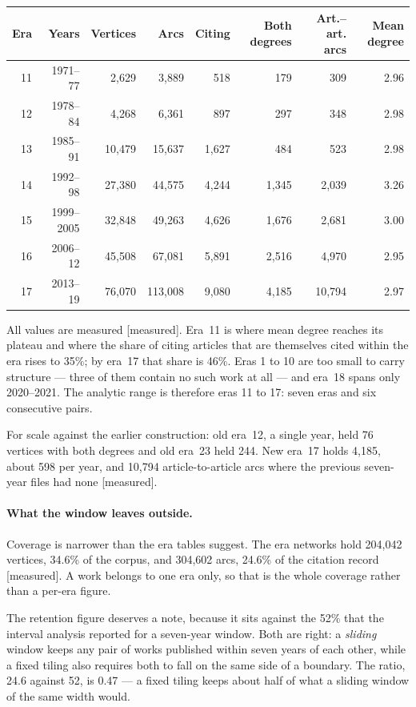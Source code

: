\documentclass[11pt]{article}
\newcommand{\meas}{{\footnotesize\textsf{[measured]}}}
\begin{document}
\begin{center}
\small
\begin{tabular}{rrrrrrrr}
\toprule
Era & Years & Vertices & Arcs & Citing & Both degrees & Art.--art. arcs & Mean degree \\
\midrule
11 & 1971--77 & 2{,}629 & 3{,}889 & 518 & 179 & 309 & 2.96 \\
12 & 1978--84 & 4{,}268 & 6{,}361 & 897 & 297 & 348 & 2.98 \\
13 & 1985--91 & 10{,}479 & 15{,}637 & 1{,}627 & 484 & 523 & 2.98 \\
14 & 1992--98 & 27{,}380 & 44{,}575 & 4{,}244 & 1{,}345 & 2{,}039 & 3.26 \\
15 & 1999--2005 & 32{,}848 & 49{,}263 & 4{,}626 & 1{,}676 & 2{,}681 & 3.00 \\
16 & 2006--12 & 45{,}508 & 67{,}081 & 5{,}891 & 2{,}516 & 4{,}970 & 2.95 \\
17 & 2013--19 & 76{,}070 & 113{,}008 & 9{,}080 & 4{,}185 & 10{,}794 & 2.97 \\
\bottomrule
\end{tabular}
\end{center}

\noindent All values are measured \meas{}. Era~11 is where mean degree reaches its plateau
and where the share of citing articles that are themselves cited within the era rises to
35\%; by era~17 that share is 46\%. Eras 1 to 10 are too small to carry structure --- three
of them contain no such work at all --- and era~18 spans only 2020--2021. The analytic range
is therefore eras 11 to 17: seven eras and six consecutive pairs.

For scale against the earlier construction: old era~12, a single year, held 76 vertices with
both degrees and old era~23 held 244. New era~17 holds 4{,}185, about 598 per year, and
10{,}794 article-to-article arcs where the previous seven-year files had none \meas{}.

\paragraph{What the window leaves outside.} Coverage is narrower than the era tables suggest.
The era networks hold 204{,}042 vertices, 34.6\% of the corpus, and 304{,}602 arcs, 24.6\% of
the citation record \meas{}. A work belongs to one era only, so that is the whole coverage
rather than a per-era figure.

The retention figure deserves a note, because it sits against the 52\% that the interval
analysis reported for a seven-year window. Both are right: a \emph{sliding} window keeps any
pair of works published within seven years of each other, while a fixed tiling also requires
both to fall on the same side of a boundary. The ratio, 24.6 against 52, is 0.47 --- a fixed
tiling keeps about half of what a sliding window of the same width would.
\end{document}
